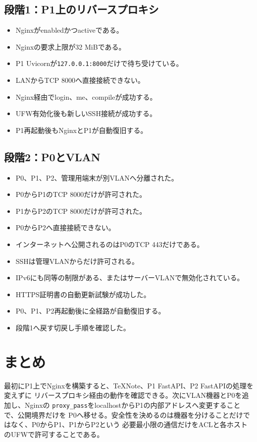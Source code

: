 \documentclass[uplatex,a4paper,11pt]{jsarticle}
\begin{document}
\subsection{段階1：P1上のリバースプロキシ}

\begin{itemize}
  \item[$\square$] Nginxがenabledかつactiveである。
  \item[$\square$] Nginxの要求上限が32 MiBである。
  \item[$\square$] P1 Uvicornが\texttt{127.0.0.1:8000}だけで待ち受けている。
  \item[$\square$] LANからTCP 8000へ直接接続できない。
  \item[$\square$] Nginx経由でlogin、me、compileが成功する。
  \item[$\square$] UFW有効化後も新しいSSH接続が成功する。
  \item[$\square$] P1再起動後もNginxとP1が自動復旧する。
\end{itemize}

\subsection{段階2：P0とVLAN}

\begin{itemize}
  \item[$\square$] P0、P1、P2、管理用端末が別VLANへ分離された。
  \item[$\square$] P0からP1のTCP 8000だけが許可された。
  \item[$\square$] P1からP2のTCP 8000だけが許可された。
  \item[$\square$] P0からP2へ直接接続できない。
  \item[$\square$] インターネットへ公開されるのはP0のTCP 443だけである。
  \item[$\square$] SSHは管理VLANからだけ許可される。
  \item[$\square$] IPv6にも同等の制限がある、またはサーバーVLANで無効化されている。
  \item[$\square$] HTTPS証明書の自動更新試験が成功した。
  \item[$\square$] P0、P1、P2再起動後に全経路が自動復旧する。
  \item[$\square$] 段階1へ戻す切戻し手順を確認した。
\end{itemize}

\section{まとめ}

最初にP1上でNginxを構築すると、TeXNote、P1 FastAPI、P2 FastAPIの処理を変えずに
リバースプロキシ経由の動作を確認できる。次にVLAN機器とP0を追加し、Nginxの
\texttt{proxy\_pass}をlocalhostからP1の内部アドレスへ変更することで、公開境界だけを
P0へ移せる。安全性を決めるのは機器を分けることだけではなく、P0からP1、P1からP2という
必要最小限の通信だけをACLと各ホストのUFWで許可することである。
\end{document}
